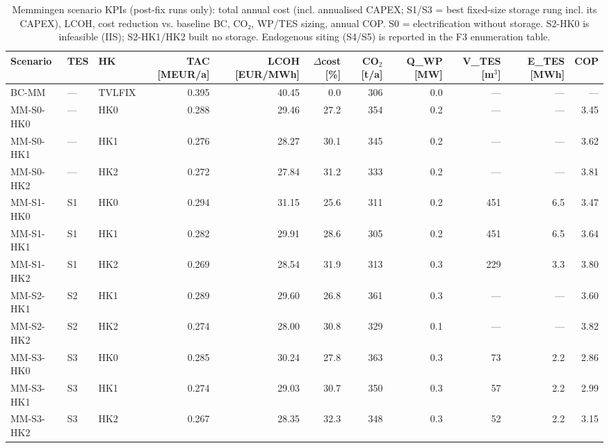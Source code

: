 \begin{table}[htbp]
  \centering
  \caption{Memmingen scenario KPIs (post-fix runs only): total annual cost (incl. annualised CAPEX; S1/S3 = best fixed-size storage rung incl. its CAPEX), LCOH, cost reduction vs. baseline BC, CO₂, WP/TES sizing, annual COP. S0 = electrification without storage. S2-HK0 is infeasible (IIS); S2-HK1/HK2 built no storage. Endogenous siting (S4/S5) is reported in the F3 enumeration table.}
  \label{tab:tab_T4_memmingen_kpis}
  \begin{tabular}{ll lrrrrrrrr}
  \toprule
  Scenario & TES & HK & TAC [MEUR/a] & LCOH [EUR/MWh] & $\Delta$cost [\%] & CO$_2$ [t/a] & Q\_WP [MW] & V\_TES [m$^3$] & E\_TES [MWh] & COP \\
  \midrule
  BC-MM & — & TVLFIX & 0.395 & 40.45 & 0.0 & 306 & 0.0 & — & — & — \\
  MM-S0-HK0 & — & HK0 & 0.288 & 29.46 & 27.2 & 354 & 0.2 & — & — & 3.45 \\
  MM-S0-HK1 & — & HK1 & 0.276 & 28.27 & 30.1 & 345 & 0.2 & — & — & 3.62 \\
  MM-S0-HK2 & — & HK2 & 0.272 & 27.84 & 31.2 & 333 & 0.2 & — & — & 3.81 \\
  MM-S1-HK0 & S1 & HK0 & 0.294 & 31.15 & 25.6 & 311 & 0.2 & 451 & 6.5 & 3.47 \\
  MM-S1-HK1 & S1 & HK1 & 0.282 & 29.91 & 28.6 & 305 & 0.2 & 451 & 6.5 & 3.64 \\
  MM-S1-HK2 & S1 & HK2 & 0.269 & 28.54 & 31.9 & 313 & 0.3 & 229 & 3.3 & 3.80 \\
  MM-S2-HK1 & S2 & HK1 & 0.289 & 29.60 & 26.8 & 361 & 0.3 & — & — & 3.60 \\
  MM-S2-HK2 & S2 & HK2 & 0.274 & 28.00 & 30.8 & 329 & 0.1 & — & — & 3.82 \\
  MM-S3-HK0 & S3 & HK0 & 0.285 & 30.24 & 27.8 & 363 & 0.3 & 73 & 2.2 & 2.86 \\
  MM-S3-HK1 & S3 & HK1 & 0.274 & 29.03 & 30.7 & 350 & 0.3 & 57 & 2.2 & 2.99 \\
  MM-S3-HK2 & S3 & HK2 & 0.267 & 28.35 & 32.3 & 348 & 0.3 & 52 & 2.2 & 3.15 \\
  \bottomrule
  \end{tabular}
\end{table}
